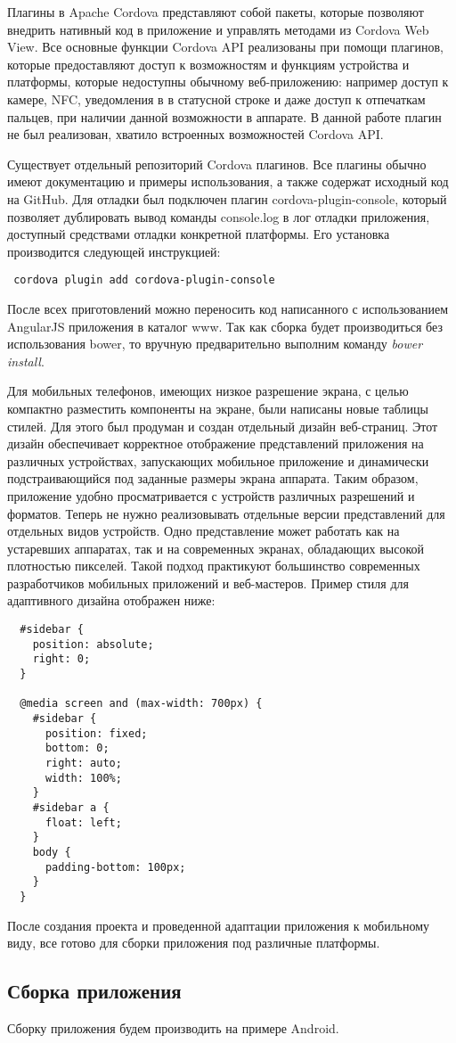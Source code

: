 Плагины в Apache Cordova представляют собой пакеты, которые позволяют внедрить нативный код в приложение и управлять методами из Cordova Web View. Все основные функции Cordova API реализованы при помощи плагинов, которые предоставляют доступ к возможностям и функциям устройства и платформы, которые недоступны обычному веб-приложению: например доступ к камере, NFC, уведомления в в статусной строке и даже доступ к отпечаткам пальцев, при наличии данной возможности в аппарате. В данной работе плагин не был реализован, хватило встроенных возможностей Cordova API.

Существует отдельный репозиторий Cordova плагинов. Все плагины обычно имеют документацию и примеры использования, а также содержат исходный код на GitHub. Для отладки был подключен плагин cordova-plugin-console, который позволяет дублировать вывод команды console.log в лог отладки приложения, доступный средствами отладки конкретной платформы. Его установка производится следующей инструкцией:
\begin{lstlisting}
 cordova plugin add cordova-plugin-console
\end{lstlisting}

После всех приготовлений можно переносить код написанного с использованием AngularJS приложения в каталог www. Так как сборка будет производиться без использования bower, то вручную предварительно выполним команду \textit{bower install}. 

Для мобильных телефонов, имеющих низкое разрешение экрана, с целью компактно разместить компоненты на экране, были написаны новые таблицы стилей. Для этого был продуман и создан отдельный дизайн веб-страниц. Этот дизайн обеспечивает корректное отображение представлений приложения на различных устройствах, запускающих мобильное приложение и динамически подстраивающийся под заданные размеры экрана аппарата. Таким образом, приложение удобно просматривается с устройств различных разрешений и форматов. Теперь не нужно реализовывать отдельные версии представлений для отдельных видов устройств. Одно представление может работать как на устаревших аппаратах, так и на современных экранах, обладающих высокой плотностью пикселей. Такой подход практикуют большинство современных разработчиков мобильных приложений и веб-мастеров. Пример стиля для адаптивного дизайна отображен ниже:
\begin{lstlisting}
  #sidebar {
    position: absolute;
    right: 0;
  }

  @media screen and (max-width: 700px) {
    #sidebar {
      position: fixed;
      bottom: 0;
      right: auto;
      width: 100%;
    }
    #sidebar a {
      float: left;
    }
    body {
      padding-bottom: 100px;
    }
  }
\end{lstlisting}

После создания проекта и проведенной адаптации приложения к мобильному виду, все готово для сборки приложения под различные платформы.

\subsection{Сборка приложения}
Сборку приложения будем производить на примере Android. 